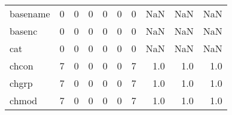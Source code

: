 \begin{tabular}{lrrrrrrrrr}
basename  &                                                  0 &                                                  0 &                                                  0 &                                                  0 &                                                  0 &                                                  0 &                                                NaN &                                    NaN &                                  NaN \\
basenc    &                                                  0 &                                                  0 &                                                  0 &                                                  0 &                                                  0 &                                                  0 &                                                NaN &                                    NaN &                                  NaN \\
cat       &                                                  0 &                                                  0 &                                                  0 &                                                  0 &                                                  0 &                                                  0 &                                                NaN &                                    NaN &                                  NaN \\
chcon     &                                                  7 &                                                  0 &                                                  0 &                                                  0 &                                                  0 &                                                  7 &                                                1.0 &                                    1.0 &                                  1.0 \\
chgrp     &                                                  7 &                                                  0 &                                                  0 &                                                  0 &                                                  0 &                                                  7 &                                                1.0 &                                    1.0 &                                  1.0 \\
chmod     &                                                  7 &                                                  0 &                                                  0 &                                                  0 &                                                  0 &                                                  7 &                                                1.0 &                                    1.0 &                                  1.0 \\

\end{tabular}
